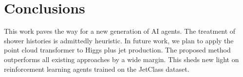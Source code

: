 \section{Conclusions}\label{sec:conclusions}

This work paves the way for a new generation of AI agents. The treatment
of shower histories is admittedly heuristic. In future work, we plan to
apply the point cloud transformer to Higgs plus jet production. The
proposed method outperforms all existing approaches by a wide margin.
This sheds new light on reinforcement learning agents trained on the
JetClass dataset.


